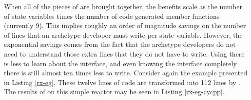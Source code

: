 When all of the pieces of \cycpp are brought together, the benefits scale as the 
number of state variables times the number of code generated member functions 
(currently 9). This implies roughly an order of magnitude savings on the number of 
lines that an archetype developer must write per state variable. However, the 
exponential savings comes from the fact that the archetype developers do not need
to understand those extra lines that they do not have to write. Using \cycpp 
there is less to learn about the \cyclus interface, and even knowing the \cyclus
interface completely there is still almost ten times less to write. Consider 
again the  example presented in Listing \ref{rx-eg}.  These twelve 
lines of code are transformed into 112 lines by \cycpp.  The results of \cycpp
on this simple reactor may be seen in Listing \ref{rx-eg-cycpp}. 

